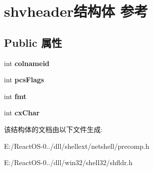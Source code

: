 \hypertarget{structshvheader}{}\section{shvheader结构体 参考}
\label{structshvheader}
\subsection*{Public 属性}
\begin{DoxyCompactItemize}
\item 
\mbox{\label{structshvheader_a5ab4fc7095d800d514514549b297ac9e}} 
int {\bfseries colnameid}
\item 
\mbox{\label{structshvheader_abcdcb66165a29a29907c57595e4a78c2}} 
int {\bfseries pcs\+Flags}
\item 
\mbox{\label{structshvheader_af893b37695c0fa0de7a6822658e297f3}} 
int {\bfseries fmt}
\item 
\mbox{\label{structshvheader_af58adc57d3254a61038c4e0c23d2a6e3}} 
int {\bfseries cx\+Char}
\end{DoxyCompactItemize}


该结构体的文档由以下文件生成\+:\begin{DoxyCompactItemize}
\item 
E\+:/\+React\+O\+S-\/0../dll/shellext/netshell/precomp.\+h\item 
E\+:/\+React\+O\+S-\/0../dll/win32/shell32/shfldr.\+h\end{DoxyCompactItemize}
